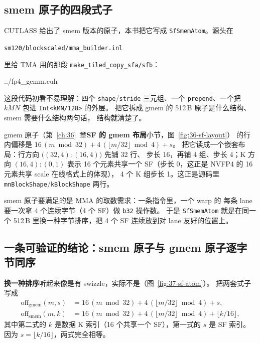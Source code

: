 \subsection{smem 原子的四段式子}

CUTLASS 给出了 smem 版本的原子，本书把它写成
\texttt{SfSmemAtom}。源头在
\begin{center}
\texttt{sm120/\allowbreak blockscaled/\allowbreak mma\_builder.inl}
\end{center}
里给 TMA 用的那段 \texttt{make\_tiled\_copy\_sfa/sfb}：

\begin{lstinputlisting}[linerange={527-547},firstnumber=auto,
  title={fp4\_gemm.cuh L527-547（SfSmemAtom：四个 shape/stride 三元组）}]{../fp4_gemm.cuh}
\end{lstinputlisting}

这段代码初看不易理解：四个 \texttt{shape}/\texttt{stride} 三元组、一个
\texttt{prepend}、一个把 $kMN$ 包进 \texttt{Int<kMN/128>} 的外层。
把它拆成 gmem 的 512\,B 原子是什么结构、smem 需要什么结构两句话，
结构就清楚了。

gmem 原子（第~\ref{ch:36}~章\textbf{SF 的 gmem 布局}小节，图~\ref{fig:36-sf-layout}）
的行内偏移是 $16\,(m\bmod 32) + 4\,(\lfloor m/32\rfloor\bmod 4) + s$。
把它读成一个嵌套布局：行方向 $\bigl((32,4){:}(16,4)\bigr)$ 先铺 32 行、
步长 16，再铺 4 组、步长 4；K 方向 $(16,4){:}(0,1)$ 表示 16 个元素共享一个
SF（步长 0，这正是 NVFP4 的 16 元素共享 scale 在线格式上的体现），
4 个 K 组步长 1。这正是源码里 \texttt{mnBlockShape}/\texttt{kBlockShape}
两行。

smem 原子要满足的是 MMA 的取数需求：一条指令里，一个 warp 的
每条 lane 要一次拿 4 个连续字节（4 个 SF）做 \texttt{b32} 操作数。
于是 \texttt{SfSmemAtom} 就是在同一个 512\,B 里换一种字节排序，把
4 个 SF 连续放到对 lane 友好的位置上。

\subsection{一条可验证的结论：smem 原子与 gmem 原子逐字节同序}

\textbf{换一种排序}听起来像是有 swizzle，实际不是（图~\ref{fig:37-sf-atom}）。
把两套式子写成
\begin{align}
  \mathrm{off}_{\mathrm{gmem}}(m,s) &= 16\,(m\bmod 32) + 4\,(\lfloor m/32\rfloor\bmod 4) + s, \\
  \mathrm{off}_{\mathrm{smem}}(m,k) &= 16\,(m\bmod 32) + 4\,(\lfloor m/32\rfloor\bmod 4) + \lfloor k/16\rfloor,
\end{align}
其中第二式的 $k$ 是数据 K 索引（16 个共享一个 SF），第一式的 $s$
是 SF 索引。因为 $s = \lfloor k/16\rfloor$，两式完全相等。

